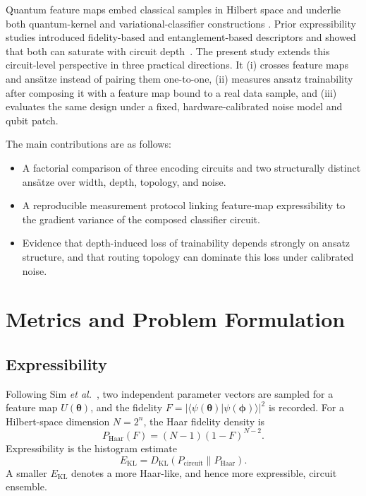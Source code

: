 \documentclass[conference]{IEEEtran}
\begin{document}
Quantum feature maps embed classical samples in Hilbert space and underlie
both quantum-kernel and variational-classifier constructions
\cite{havlicek2019supervised}.  Prior expressibility studies introduced
fidelity-based and entanglement-based descriptors and showed that both can
saturate with circuit depth~\cite{sim2019expressibility}.  The present study
extends this circuit-level perspective in three practical directions.  It
(i) crosses feature maps and ans\"atze instead of pairing them one-to-one,
(ii) measures ansatz trainability after composing it with a feature map
bound to a real data sample, and (iii) evaluates the same design under a
fixed, hardware-calibrated noise model and qubit patch.

The main contributions are as follows:
\begin{itemize}
  \item A factorial comparison of three encoding circuits and two
  structurally distinct ans\"atze over width, depth, topology, and noise.
  \item A reproducible measurement protocol linking feature-map
  expressibility to the gradient variance of the composed classifier
  circuit.
  \item Evidence that depth-induced loss of trainability depends strongly on
  ansatz structure, and that routing topology can dominate this loss under
  calibrated noise.
\end{itemize}

\section{Metrics and Problem Formulation}

\subsection{Expressibility}

Following Sim \emph{et al.}~\cite{sim2019expressibility}, two independent
parameter vectors are sampled for a feature map $U(\boldsymbol{\theta})$,
and the fidelity $F=|\langle\psi(\boldsymbol{\theta})|
\psi(\boldsymbol{\phi})\rangle|^2$ is recorded.  For a Hilbert-space
dimension $N=2^n$, the Haar fidelity density is
\begin{equation}
  P_{\mathrm{Haar}}(F)=(N-1)(1-F)^{N-2}.
\end{equation}
Expressibility is the histogram estimate
\begin{equation}
  E_{\mathrm{KL}}=D_{\mathrm{KL}}
  \left(P_{\mathrm{circuit}}\parallel P_{\mathrm{Haar}}\right).
\end{equation}
A smaller $E_{\mathrm{KL}}$ denotes a more Haar-like, and hence more
expressible, circuit ensemble.
\end{document}
